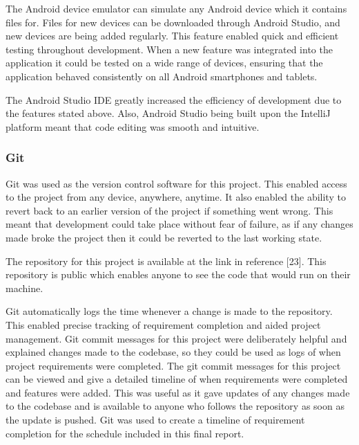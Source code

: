 \documentclass{article}
\begin{document}
The Android device emulator can simulate any Android device which it contains files for. Files for new devices can be downloaded through Android Studio, and new devices are being added regularly. This feature enabled quick and efficient testing throughout development. When a new feature was integrated into the application it could be tested on a wide range of devices, ensuring that the application behaved consistently on all Android smartphones and tablets. \par

The Android Studio IDE greatly increased the efficiency of development due to the features stated above. Also, Android Studio being built upon the IntelliJ platform meant that code editing was smooth and intuitive. \par

\subsubsection{Git}

Git was used as the version control software for this project. This enabled access to the project from any device, anywhere, anytime. It also enabled the ability to revert back to an earlier version of the project if something went wrong. This meant that development could take place without fear of failure, as if any changes made broke the project then it could be reverted to the last working state. \par

The repository for this project is available at the link in reference [23]. This repository is public which enables anyone to see the code that would run on their machine. \par

Git automatically logs the time whenever a change is made to the repository. This enabled precise tracking of requirement completion and aided project management. Git commit messages for this project were deliberately helpful and explained changes made to the codebase, so they could be used as logs of when project requirements were completed. The git commit messages for this project can be viewed and give a detailed timeline of when requirements were completed and features were added. This was useful as it gave updates of any changes made to the codebase and is available to anyone who follows the repository as soon as the update is pushed. Git was used to create a timeline of requirement completion for the schedule included in this final report. \par
\end{document}
